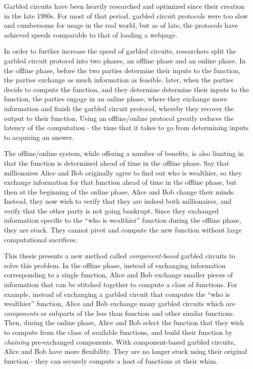 Garbled circuits have been heavily researched and optimized since their creation in the late 1980s.
For most of that period, garbled circuit protocols were too slow and cumbersome for usage in the real world, but as of late, the protocols have achieved speeds comparable to that of loading a webpage. 

In order to further increase the speed of garbled circuits, researchers split the garbled circuit protocol into two phases, an offline phase and an online phase.
In the offline phase, before the two parties determine their inputs to the function, the parties exchange as much information as feasible. 
later, when the parties decide to compute the function, and they determine determine their inputs to the function, the parties engage in an online phase, where they exchange more information and finish the garbled circuit protocol, whereby they recover the output to their function.
Using an offline/online protocol greatly reduces the latency of the computation - the time that it takes to go from determining inputs to acquiring an answer.

The offline/online system, while offering a number of benefits, is also limiting in that the function is determined ahead of time in the offline phase.
Say that millionaires Alice and Bob originally agree to find out who is wealthier, so they exchange information for that function ahead of time in the offline phase, but then at the beginning of the online phase, Alice and Bob change their minds. 
Instead, they now wish to verify that they are indeed both millionaires, and verify that the other party is not going bankrupt.
Since they exchanged information specific to the ``who is wealthier'' function during the offline phase, they are stuck. 
They cannot pivot and compute the new function without large computational sacrifices.

This thesis presents a new method called \textit{component-based} garbled circuits to solve this problem.
In the offline phase, instead of exchanging information corresponding to a single function, Alice and Bob exchange smaller pieces of information that can be stitched together to compute a class of functions.
For example, instead of exchanging a garbled circuit that computes the ``who is wealthier'' function, Alice and Bob exchange many garbled circuits which are \textit{components} or subparts of the less than function and other similar functions.
Then, during the online phase, Alice and Bob select the function that they wish to compute from the class of available functions, and build their function by \textit{chaining} pre-exchanged components.
With component-based garbled circuits, Alice and Bob have more flexibility. 
They are no longer stuck using their original function - they can securely compute a host of functions at their whim. 

